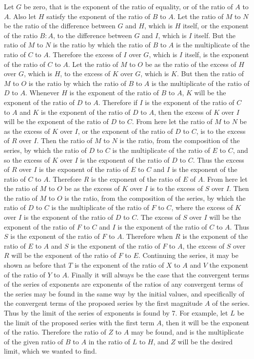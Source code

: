 \documentclass[11pt,letterpaper]{book}
\begin{document}
Let $G$ be zero, that is the exponent of the ratio of equality, or of the ratio
of $A$ to $A$.
Also let $H$ satisfy the exponent of the ratio of $B$ to $A$. 
Let the ratio of $M$ to $N$ be the ratio of the difference between $G$ and $H$,
which is $H$ itself, or the exponent of the ratio $B:A$, to the difference
between $G$ and $I$, which is $I$ itself. 
But the ratio of $M$ to $N$ is the ratio by which the ratio of $B$ to $A$ is the
multiplicate of the ratio of $C$ to $A$.
Therefore the excess of $I$ over $G$, which is $I$ itself, is the exponent of
the ratio of $C$ to $A$. 
Let the ratio of $M$ to $O$ be as the ratio of the excess of $H$ over $G$, which
is $H$, to the excess of $K$ over $G$, which is $K$. 
But then the ratio of $M$ to $O$ is the ratio by which the ratio of $B$ to $A$
is the multiplicate of the ratio of $D$ to $A$. 
Whenever $H$ is the exponent of the ratio of $B$ to $A$, $K$ will be the
exponent of the ratio of $D$ to $A$.
Therefore if $I$ is the exponent of the ratio of $C$ to $A$ and $K$ is the
exponent of the ratio of $D$ to $A$, then the excess of $K$ over $I$ will be the
exponent of the ratio of $D$ to $C$. 
From here let the ratio of $M$ to $N$ be as the excess of $K$
over $I$, or the exponent of the ratio of $D$ to $C$, is to the excess of $R$
over $I$. 
Then the ratio of $M$ to $N$ is the ratio, from the composition of the series,
by which the ratio of $D$ to $C$ is the multiplicate of the ratio of $E$ to $C$,
and so the excess of $K$ over $I$ is the exponent of the ratio of $D$ to $C$.
Thus the excess of $R$ over $I$ is the exponent of the ratio of $E$ to $C$ and
$I$ is the exponent of the ratio of $C$ to $A$.
Therefore $R$ is the exponent of the ratio of $E$ of $A$. 
From here let the ratio of $M$ to $O$ be
as the excess of $K$ over $I$ is to the excess of $S$ over $I$.
Then the ratio of $M$ to $O$ is the ratio, from the composition of the series,
by which the ratio of $D$ to $C$ is the multiplicate of the ratio of $F$ to $C$,
where the excess of $K$ over $I$ is the exponent of the ratio of $D$ to $C$. 
The excess of $S$ over $I$ will be the exponent of the ratio of $F$ to $C$ and
$I$ is the exponent of the ratio of $C$ to $A$. Thus $S$ is the exponent of the
ratio of $F$ to $A$. 
Therefore when $R$ is the exponent of the ratio of $E$ to $A$ and $S$ is the
exponent of the ratio of $F$ to $A$, the excess of $S$ over $R$ will be the
exponent of the ratio of $F$ to $E$. Continuing the series, it may be shown as
before that $T$ is the exponent of the ratio of $X$ to $A$ and $V$ the exponent
of the ratio of $Y$ to $A$. Finally it will always be the case that the
convergent terms of the series of exponents are exponents of the ratios of any
convergent terms of the series may be found in the same way by the initial
values, and specifically of the convergent terms of the proposed series by the
first magnitude $A$ of the series.
Thus by the limit of the series of exponents is found by 7. 
For example, let $L$ be the limit of the proposed series with the first term
$A$, then it will be the exponent of the ratio. 
Therefore the ratio of $Z$ to $A$ may be found, and is the multiplicate of
the given ratio of $B$ to $A$ in the ratio of $L$ to $H$, and $Z$ will be the
desired limit, which we wanted to find.
\end{document}

